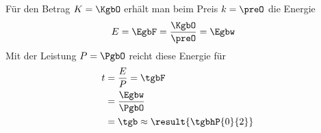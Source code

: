 Für den Betrag $K = \KgbO$ erhält man beim Preis $k = \preO$ die Energie
\begin{align}
 E &= \EgbF = \frac{\KgbO}{\preO} = \Egbw
\end{align}
Mit der Leistung $P = \PgbO$ reicht diese Energie für
\begin{align}
 t &= \frac{E}{P} = \tgbF \\
   &= \frac{\Egbw}{\PgbO} \\
   &= \tgb \approx \result{\tgbhP{0}{2}}
\end{align}
